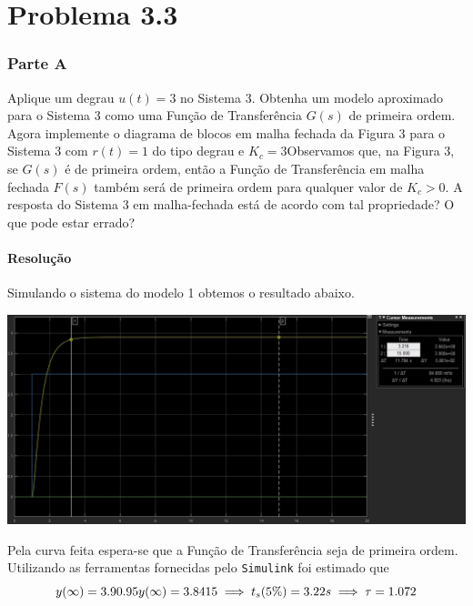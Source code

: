 \documentclass[
]{book}
\theoremstyle{definition}
\theoremstyle{definition}
\theoremstyle{definition}
\theoremstyle{remark}
\begin{document}
\hypertarget{problema-3.3}{%
\section*{Problema 3.3}\label{problema-3.3}}

\hypertarget{parte-a}{%
\subsubsection*{Parte A}\label{parte-a}}

Aplique um degrau \(u(t) = 3\) no Sistema 3. Obtenha um modelo aproximado para o Sistema 3 como uma Função de Transferência \(G(s)\) de primeira ordem. Agora implemente o diagrama de blocos em malha fechada da Figura 3 para o Sistema 3 com \(r(t) = 1\) do tipo degrau e \(K_c = 3\)Observamos que, na Figura 3, se \(G(s)\) é de primeira ordem, então a Função de Transferência em malha fechada \(F(s)\) também será de primeira ordem para qualquer valor de \(K_c > 0\). A resposta do Sistema 3 em malha-fechada está de acordo com tal propriedade? O que pode estar errado?

\hypertarget{resoluuxe7uxe3o-2}{%
\paragraph*{Resolução}\label{resoluuxe7uxe3o-2}}

Simulando o sistema do modelo 1 obtemos o resultado abaixo.

\includegraphics{Imagens/Lab3/Resolução/prob3AA.jpg}

Pela curva feita espera-se que a Função de Transferência seja de primeira ordem. Utilizando as ferramentas fornecidas pelo \texttt{Simulink} foi estimado que
\[
y(\infty) = 3.9 \\ 
0.95y(\infty) = 3.8415 \implies  t_s(5\%) = 3.22s \implies \tau = 1.072
\]
\end{document}

